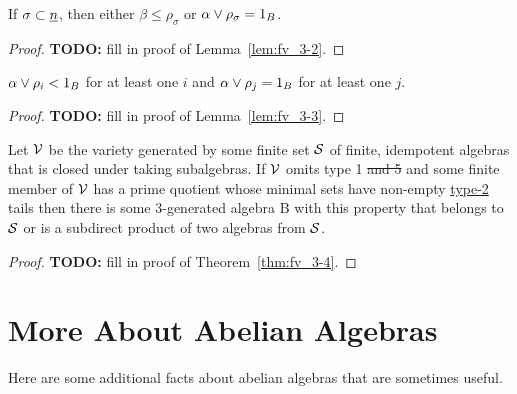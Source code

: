 \begin{lem}
  \label{lem:fv_3-2}
  If $\sigma \subset \underline{n}$, then
  either $\beta \leq \rho_\sigma$ or $\alpha \vee \rho_\sigma = 1_B$.
\end{lem}
\begin{proof}
  {\bf TODO:} fill in proof of  Lemma~\ref{lem:fv_3-2}.
\end{proof}

\begin{lem}
  \label{lem:fv_3-3}
  $\alpha \vee \rho_i < 1_B$ for at least one $i$ and $\alpha \vee \rho_j = 1_B$
  for at least one $j$.  
\end{lem}
\begin{proof}
  {\bf TODO:} fill in proof of  Lemma~\ref{lem:fv_3-3}.
\end{proof}

\begin{thm}
  \label{thm:fv_3-4}
  Let $\mathcal{V}$ be the variety generated by some finite set $\mathcal{S}$ of finite,
  idempotent algebras that is closed under taking subalgebras. If $\mathcal{V}$
  omits type 1 \sout{and 5} and some finite member of $\mathcal{V}$ has a prime quotient
  whose minimal sets have non-empty \underline{type-2} tails then there is some
  3-generated algebra B with this property that belongs to $\mathcal{S}$ or is a subdirect
  product of two algebras from $\mathcal{S}$. 
\end{thm}
\begin{proof}
  {\bf TODO:} fill in proof of Theorem~\ref{thm:fv_3-4}.
\end{proof}


\draftbreak

\appendix


\section{More About Abelian Algebras}
\label{sec:abelian-algebras}
Here are some additional facts about abelian algebras that are sometimes useful.

